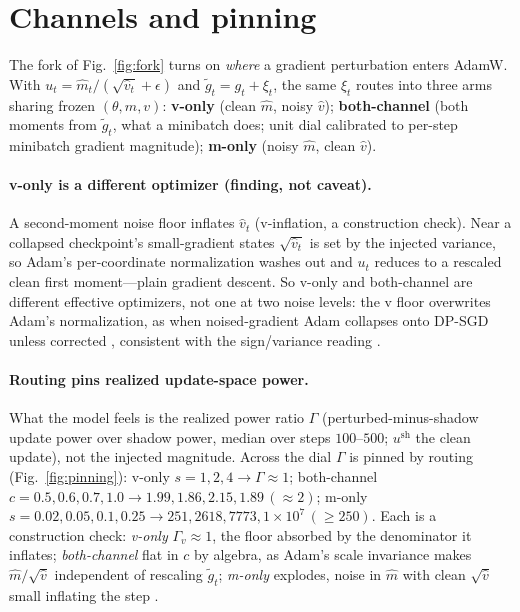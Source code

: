 \section{Channels and pinning}
\label{sec:pinning}

The fork of Fig.~\ref{fig:fork} turns on \emph{where} a gradient perturbation
enters AdamW. With $u_t=\hat m_t/(\sqrt{\hat v_t}+\epsilon)$ and
$\tilde g_t=g_t+\xi_t$, the same $\xi_t$ routes into three arms sharing frozen
$(\theta,m,v)$: \textbf{v-only} (clean $\hat m$, noisy $\hat v$);
\textbf{both-channel} (both moments from $\tilde g_t$, what a minibatch does; unit
dial calibrated to per-step minibatch gradient magnitude); \textbf{m-only} (noisy
$\hat m$, clean $\hat v$).

\paragraph{v-only is a different optimizer (finding, not caveat).}
A second-moment noise floor inflates $\hat v_t$ (v-inflation, a construction
check). Near a collapsed checkpoint's small-gradient states $\sqrt{\hat v_t}$ is
set by the injected variance, so Adam's per-coordinate normalization washes out
and $u_t$ reduces to a rescaled clean first moment---plain gradient descent. So
v-only and both-channel are different effective optimizers, not one at two noise
levels: the v floor overwrites Adam's normalization, as when noised-gradient Adam
collapses onto DP-SGD unless corrected \citep{dpadambc,litramer}, consistent with
the sign/variance reading \citep{balleshennig,kunstner}.

\paragraph{Routing pins realized update-space power.}
What the model feels is the realized power ratio $\Gamma$ (perturbed-minus-shadow
update power over shadow power, median over steps $100$--$500$; $u^{\mathrm{sh}}$
the clean update), not the injected magnitude. Across the dial $\Gamma$ is pinned
by routing (Fig.~\ref{fig:pinning}): v-only $s{=}1,2,4\!\to\!\Gamma\!\approx\!1$;
both-channel $c{=}0.5,0.6,0.7,1.0\!\to\!1.99,1.86,2.15,1.89\,(\approx2)$; m-only
$s{=}0.02,0.05,0.1,0.25\!\to\!251,2618,7773,1{\times}10^{7}\,(\ge250)$. Each is a
construction check: \emph{v-only} $\Gamma_v\!\approx\!1$, the floor absorbed by the
denominator it inflates; \emph{both-channel} flat in $c$ by algebra, as Adam's
scale invariance \citep{adam} makes $\hat m/\sqrt{\hat v}$ independent of rescaling
$\tilde g_t$; \emph{m-only} explodes, noise in $\hat m$ with clean $\sqrt{\hat v}$
small inflating the step \citep{amsgrad}.

